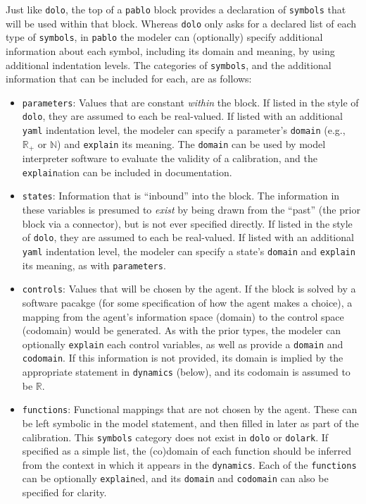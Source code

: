 \documentclass[12pt,pdftex,letterpaper]{article}
\newcommand{\N}{\mathbb{N}}
\newcommand{\R}{\mathbb{R}}
\begin{document}
Just like \texttt{dolo}, the top of a \texttt{pablo} block provides a declaration of \texttt{symbols} that will be used within that block. Whereas \texttt{dolo} only asks for a declared list of each type of \texttt{symbols}, in \texttt{pablo} the modeler can (optionally) specify additional information about each symbol, including its domain and meaning, by using additional indentation levels. The categories of \texttt{symbols}, and the additional information that can be included for each, are as follows:
\begin{itemize}
	\item \texttt{parameters}: Values that are constant \textit{within} the block. If listed in the style of \texttt{dolo}, they are assumed to each be real-valued. If listed with an additional \texttt{yaml} indentation level, the modeler can specify a parameter's \texttt{domain} (e.g., $\R_+$ or $\N$) and \texttt{explain} its meaning. The \texttt{domain} can be used by model interpreter software to evaluate the validity of a calibration, and the \texttt{explain}ation can be included in documentation.
	
	\item \texttt{states}: Information that is ``inbound'' into the block. The information in these variables is presumed to \textit{exist} by being drawn from the ``past'' (the prior block via a connector), but is not ever specified directly. If listed in the style of \texttt{dolo}, they are assumed to each be real-valued. If listed with an additional \texttt{yaml} indentation level, the modeler can specify a state's \texttt{domain} and \texttt{explain} its meaning, as with \texttt{parameters}.
	
	\item \texttt{controls}: Values that will be chosen by the agent. If the block is solved by a software pacakge (for some specification of how the agent makes a choice), a mapping from the agent's information space (domain) to the control space (codomain) would be generated. As with the prior types, the modeler can optionally \texttt{explain} each control variables, as well as provide a \texttt{domain} and \texttt{codomain}. If this information is not provided, its domain is implied by the appropriate statement in \texttt{dynamics} (below), and its codomain is assumed to be $\R$.
	
	\item \texttt{functions}: Functional mappings that are not chosen by the agent. These can be left symbolic in the model statement, and then filled in later as part of the calibration. This \texttt{symbols} category does not exist in \texttt{dolo} or \texttt{dolark}. If specified as a simple list, the (co)domain of each function should be inferred from the context in which it appears in the \texttt{dynamics}. Each of the \texttt{functions} can be optionally \texttt{explain}ed, and its \texttt{domain} and \texttt{codomain} can also be specified for clarity.
	

\end{itemize}
\end{document}
